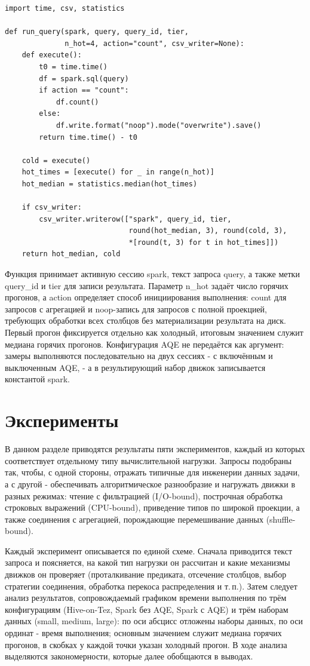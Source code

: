 \documentclass[12pt,letterpaper, onecolumn]{exam}
\begin{document}
\begin{lstlisting}[style=pythoncode, caption={Обёртка запуска и измерения для Spark}, label={lst:runner}]
import time, csv, statistics

def run_query(spark, query, query_id, tier,
              n_hot=4, action="count", csv_writer=None):
    def execute():
        t0 = time.time()
        df = spark.sql(query)
        if action == "count":
            df.count()
        else:
            df.write.format("noop").mode("overwrite").save()
        return time.time() - t0

    cold = execute()
    hot_times = [execute() for _ in range(n_hot)]
    hot_median = statistics.median(hot_times)

    if csv_writer:
        csv_writer.writerow(["spark", query_id, tier,
                             round(hot_median, 3), round(cold, 3),
                             *[round(t, 3) for t in hot_times]])
    return hot_median, cold
\end{lstlisting}

\noindent Функция принимает активную сессию spark, текст запроса
query, а также метки query\_id и tier для записи результата.
Параметр n\_hot задаёт число горячих прогонов, а action определяет
способ инициирования выполнения: count для запросов с агрегацией
и noop-запись для запросов с полной проекцией, требующих обработки
всех столбцов без материализации результата на диск. Первый прогон
фиксируется отдельно как холодный, итоговым значением служит медиана
горячих прогонов. Конфигурация AQE не передаётся как аргумент: замеры
выполняются последовательно на двух сессиях - с включённым и выключенным
AQE, - а в результирующий набор движок записывается константой spark.

\section{Эксперименты}

В данном разделе приводятся результаты пяти экспериментов, каждый из которых
соответствует отдельному типу вычислительной нагрузки. Запросы подобраны так,
чтобы, с одной стороны, отражать типичные для инженерии данных задачи, а с
другой - обеспечивать алгоритмическое разнообразие и нагружать движки в разных
режимах: чтение с фильтрацией (I/O-bound), построчная обработка строковых
выражений (CPU-bound), приведение типов по широкой проекции, а также соединения
с агрегацией, порождающие перемешивание данных (shuffle-bound).

Каждый эксперимент описывается по единой схеме. Сначала приводится текст
запроса и поясняется, на какой тип нагрузки он рассчитан и какие механизмы
движков он проверяет (проталкивание предиката, отсечение столбцов, выбор
стратегии соединения, обработка перекоса распределения и т.\,п.). Затем
следует анализ результатов, сопровождаемый графиком времени выполнения по трём
конфигурациям (Hive-on-Tez, Spark без AQE, Spark с AQE) и трём наборам данных
(small, medium, large): по оси абсцисс отложены наборы данных, по оси ординат -
время выполнения; основным значением служит медиана горячих прогонов, в скобках
у каждой точки указан холодный прогон. В ходе анализа выделяются закономерности,
которые далее обобщаются в выводах.
\end{document}
